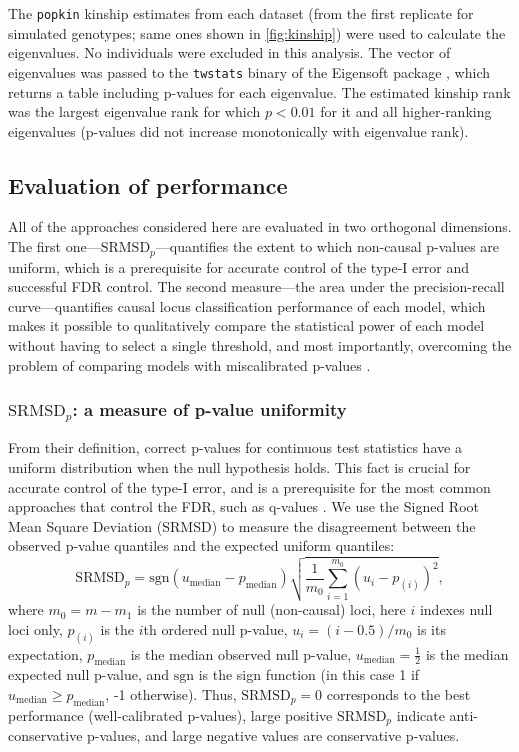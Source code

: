 \documentclass[11pt]{article}
\newcommand{\rmsd}{\text{SRMSD}_p}
\begin{document}
The \texttt{popkin} kinship estimates from each dataset (from the first replicate for simulated genotypes; same ones shown in \cref{fig:kinship}) were used to calculate the eigenvalues.
No individuals were excluded in this analysis.
The vector of eigenvalues was passed to the \texttt{twstats} binary of the Eigensoft package \citep{patterson_population_2006}, which returns a table including p-values for each eigenvalue.
The estimated kinship rank was the largest eigenvalue rank for which $p < 0.01$ for it and all higher-ranking eigenvalues (p-values did not increase monotonically with eigenvalue rank).


\subsection{Evaluation of performance}

All of the approaches considered here are evaluated in two orthogonal dimensions.
The first one---$\rmsd$---quantifies the extent to which non-causal p-values are uniform, which is a prerequisite for accurate control of the type-I error and successful FDR control.
The second measure---the area under the precision-recall curve---quantifies causal locus classification performance of each model, which makes it possible to qualitatively compare the statistical power of each model without having to select a single threshold, and most importantly, overcoming the problem of comparing models with miscalibrated p-values \citep{bouaziz_accounting_2011}.

\subsubsection{$\rmsd$: a measure of p-value uniformity}

From their definition, correct p-values for continuous test statistics have a uniform distribution when the null hypothesis holds.
This fact is crucial for accurate control of the type-I error, and is a prerequisite for the most common approaches that control the FDR, such as q-values \citep{storey_positive_2003, storey_statistical_2003}.
We use the Signed Root Mean Square Deviation (SRMSD) to measure the disagreement between the observed p-value quantiles and the expected uniform quantiles:
$$
\rmsd
=
\text{sgn}(u_\text{median} - p_\text{median} ) \sqrt{ \frac{1}{m_0} \sum_{i = 1}^{m_0} \left( u_i - p_{(i)} \right)^2 },
$$
where
$m_0 = m - m_1$ is the number of null (non-causal) loci,
here $i$ indexes null loci only,
$p_{(i)}$ is the $i$th ordered null p-value,
$u_i = ( i - 0.5 ) / m_0$ is its expectation,
$p_\text{median}$ is the median observed null p-value,
$u_\text{median} = \frac{1}{2}$ is the median expected null p-value,
and $\text{sgn}$ is the sign function (in this case 1 if $u_\text{median} \ge p_\text{median}$, -1 otherwise).
Thus, $\rmsd = 0$ corresponds to the best performance (well-calibrated p-values), large positive $\rmsd$ indicate anti-conservative p-values, and large negative values are conservative p-values.
\end{document}
